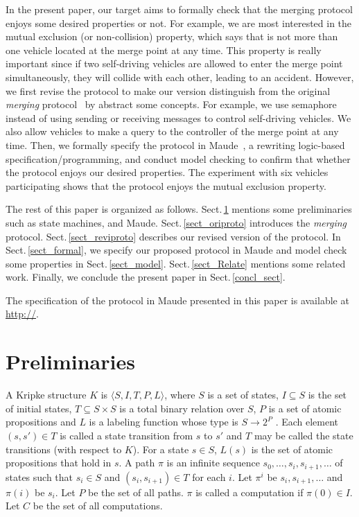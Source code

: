 \documentclass[10pt, conference, compsocconf]{IEEEtran}
\begin{document}
In the present paper, our target aims to formally check that the merging protocol enjoys some desired properties or not. For example, we are most interested in the mutual exclusion (or non-collision) property, which says that is not more than one vehicle located at the merge point at any time.
This property is really important since if two self-driving vehicles are allowed to enter the merge point simultaneously, they will collide with each other, leading to an accident.
However, we first revise the protocol to make our version distinguish from the original \textit{merging} protocol~\cite{10.1145/3055004.3055028} by abstract some concepts.
For example, we use semaphore instead of using sending or receiving messages to control self-driving vehicles. 
We also allow vehicles to make a query to the controller of the merge point at any time.
Then, we formally specify the protocol in Maude~\cite{Clavel2007LNCS}, a rewriting logic-based specification/programming, and conduct model checking to confirm that whether the protocol enjoys our desired properties.
The experiment with six vehicles participating shows that the protocol enjoys the mutual exclusion property.

The rest of this paper is organized as follows. Sect.\,\ref{sect_Prel}
mentions some preliminaries such as state machines, and Maude.
Sect.\,\ref{sect_oriproto} introduces the \textit{merging} protocol.
Sect.\,\ref{sect_reviproto} describes our revised version of the protocol.
In Sect.\,\ref{sect_formal}, we specify our proposed protocol in Maude and model check some properties in Sect.\,\ref{sect_model}.
Sect.\,\ref{sect_Relate} mentions some related work.
Finally, we conclude the present paper in Sect.\,\ref{concl_sect}.

The specification of the protocol in Maude presented in this
paper is available at \url{http://}.


\section{Preliminaries}
 \label{sect_Prel}
 
 
A Kripke structure $K$ is $\langle S,I,T,P,L \rangle$, where $S$ is a set
of states, $I \subseteq S$ is the set of initial states, $T \subseteq S \times S$
is a total binary relation over $S$, $P$ is a set of atomic
propositions and $L$ is a labeling function whose type is
$S \rightarrow 2^P$ . Each element $(s, s') \in T$ is called a state transition
from $s$ to $s'$ and $T$ may be called the state transitions
(with respect to $K$). For a state $s \in S$, $L(s)$ is the set
of atomic propositions that hold in $s$. A path $\pi$ is an infinite
sequence $s_0, \ldots , s_i, s_{i+1}, \ldots$ of states such that $s_i \in S$ and
$(s_i, s_{i+1}) \in T$ for each $i$. Let $\pi^i$ be $s_i, s_{i+1}, \ldots$ and $\pi(i)$ be
$s_i$. Let $P$ be the set of all paths. $\pi$ is called a computation
if $\pi(0) \in I$. Let $C$ be the set of all computations.
\end{document}
